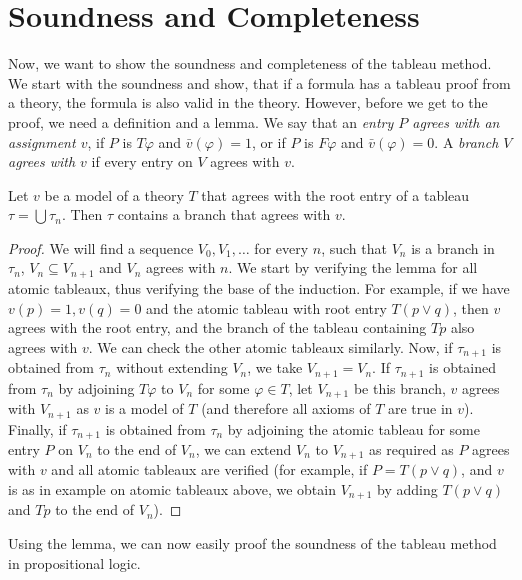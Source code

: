 \section{Soundness and Completeness}

Now, we want to show the soundness and completeness of the tableau method. We start with the soundness and show, that if a formula has a tableau proof from a theory, the formula is also valid in the theory. However, before we get to the proof, we need a definition and a lemma. We say that an \emph{entry $P$ agrees with an assignment $v$}, if $P$ is $T \varphi$ and $\bar{v}(\varphi) = 1$, or if $P$ is $F \varphi$ and $\bar{v}(\varphi) = 0$. A \emph{branch $V$ agrees with $v$} if every entry on $V$ agrees with $v$. 

\begin{lemma}
Let $v$ be a model of a theory $T$ that agrees with the root entry of a tableau $\tau = \bigcup \tau_n$. Then $\tau$ contains a branch that agrees with $v$.
\end{lemma}
\begin{proof}
We will find a sequence $V_0, V_1, \dots$ for every $n$, such that $V_n$ is a branch in $\tau_n$, $V_n \subseteq V_{n+1}$ and $V_n$ agrees with $n$. We start by verifying the lemma for all atomic tableaux, thus verifying the base of the induction. For example, if we have $v(p) = 1, v(q) = 0$ and the atomic tableau with root entry $T(p \lor q)$, then $v$ agrees with the root entry, and the branch of the tableau containing $Tp$ also agrees with $v$. We can check the other atomic tableaux similarly. Now, if $\tau_{n+1}$ is obtained from $\tau_n$ without extending $V_n$, we take $V_{n+1} = V_n$. If $\tau_{n+1}$ is obtained from $\tau_n$ by adjoining $T \varphi$ to $V_n$ for some $\varphi \in T$, let $V_{n+1}$ be this branch, $v$ agrees with $V_{n+1}$ as $v$ is a model of $T$ (and therefore all axioms of $T$ are true in $v$). Finally, if $\tau_{n+1}$ is obtained from $\tau_n$ by adjoining the atomic tableau for some entry $P$ on $V_n$ to the end of $V_n$, we can extend $V_n$ to $V_{n+1}$ as required as $P$ agrees with $v$ and all atomic tableaux are verified (for example, if $P = T(p\lor q)$, and $v$ is as in example on atomic tableaux above, we obtain $V_{n+1}$ by adding $T(p \lor q)$ and $Tp$ to the end of $V_n$).
\end{proof}

Using the lemma, we can now easily proof the soundness of the tableau method in propositional logic.

